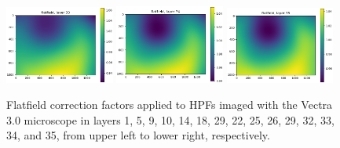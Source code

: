 \documentclass[letterpaper,11pt]{article}
\begin{document}
\begin{figure}[!ht]
\includegraphics[width=0.32\textwidth]{images/methods/flatfield_layers_vectra/flatfield_layer_33}
\includegraphics[width=0.32\textwidth]{images/methods/flatfield_layers_vectra/flatfield_layer_34}
\includegraphics[width=0.32\textwidth]{images/methods/flatfield_layers_vectra/flatfield_layer_35}
\caption{\footnotesize Flatfield correction factors applied to HPFs imaged with the Vectra 3.0 microscope in layers 1, 5, 9, 10, 14, 18, 29, 22, 25, 26, 29, 32, 33, 34, and 35, from upper left to lower right, respectively.}
\label{fig:applied_flatfield_layers_vectra}
\end{figure}
\end{document}
